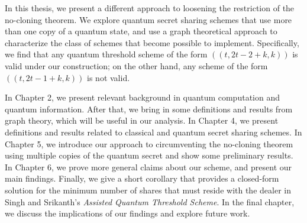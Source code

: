 In this thesis, we present a different approach to loosening the restriction of the no-cloning theorem. We explore quantum secret sharing schemes that use more than one copy of a quantum state, and use a graph theoretical approach to characterize the class of schemes that become possible to implement. Specifically, we find that any quantum threshold scheme of the form $((t,2t-2+k,k))$ is valid under our construction; on the other hand, any scheme of the form $((t,2t-1+k,k))$ is not valid.

In Chapter 2, we present relevant background in quantum computation and quantum information. After that, we bring in some definitions and results from graph theory, which will be useful in our analysis. In Chapter 4, we present definitions and results related to classical and quantum secret sharing schemes. In Chapter 5, we introduce our approach to circumventing the no-cloning theorem using multiple copies of the quantum secret and show some preliminary results. In Chapter 6, we prove more general claims about our scheme, and present our main findings. Finally, we give a short corollary that provides a closed-form solution for the minimum number of shares that must reside with the dealer in Singh and Srikanth's \textit{Assisted Quantum Threshold Scheme}. In the final chapter, we discuss the implications of our findings and explore future work.
